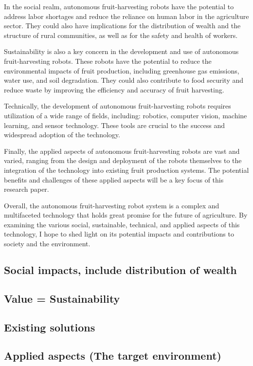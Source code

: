 \documentclass{modelica}
\begin{document}
In the social realm, autonomous fruit-harvesting robots have the potential to address labor shortages and reduce the reliance on human labor in the agriculture sector. They could also have implications for the distribution of wealth and the structure of rural communities, as well as for the safety and health of workers.

Sustainability is also a key concern in the development and use of autonomous fruit-harvesting robots. These robots have the potential to reduce the environmental impacts of fruit production, including greenhouse gas emissions, water use, and soil degradation. They could also contribute to food security and reduce waste by improving the efficiency and accuracy of fruit harvesting.

Technically, the development of autonomous fruit-harvesting robots requires utilization of a wide range of fields, including: robotics, computer vision, machine learning, and sensor technology. These tools are crucial to the success and widespread adoption of the technology.

Finally, the applied aspects of autonomous fruit-harvesting robots are vast and varied, ranging from the design and deployment of the robots themselves to the integration of the technology into existing fruit production systems. The potential benefits and challenges of these applied aspects will be a key focus of this research paper.

Overall, the autonomous fruit-harvesting robot system is a complex and multifaceted technology that holds great promise for the future of agriculture. By examining the various social, sustainable, technical, and applied aspects of this technology, I hope to shed light on its potential impacts and contributions to society and the environment.

\subsection{Social impacts, include distribution of wealth}
\subsection{Value = Sustainability}
\subsection{Existing solutions}
\subsection{Applied aspects (The target environment)}
\end{document}
